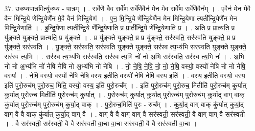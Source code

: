 \documentclass[17pt]{extarticle}
\begin{document}
37. उ॒क्थ्य॒पा॒त्रमित्यु॑क्थ्य - पा॒त्रम् । . सर्वे॑णै॒ वैव सर्वे॑ण॒ सर्वे॑णै॒वैन॑ मेन मे॒व सर्वे॑ण॒ सर्वे॑णै॒वैन᳚म् । . ए॒वैन॑ मेन मे॒वै वैन॑ मिन्द्रि॒ये णे᳚न्द्रि॒येणै॑न मे॒वै वैन॑ मिन्द्रि॒येण॑ । . ए॒न॒ मि॒न्द्रि॒ये णे᳚न्द्रि॒येणै॑न मेन मिन्द्रि॒येणा त्यती᳚न्द्रि॒येणै॑न मेन मिन्द्रि॒येणाति॑ । . इ॒न्द्रि॒येणा त्यती᳚न्द्रि॒ये णे᳚न्द्रि॒येणाति॒ प्र प्राती᳚न्द्रि॒ये णे᳚न्द्रि॒येणाति॒ प्र । . अति॒ प्र प्रात्यति॒ प्र यु॑ङ्क्ते युङ्क्ते॒ प्रात्यति॒ प्र यु॑ङ्क्ते । . प्र यु॑ङ्क्ते युङ्क्ते॒ प्र प्र यु॑ङ्क्ते॒ सर॑स्वति॒ सर॑स्वति युङ्क्ते॒ प्र प्र यु॑ङ्क्ते॒ सर॑स्वति । . यु॒ङ्क्ते॒ सर॑स्वति॒ सर॑स्वति युङ्क्ते युङ्क्ते॒ सर॑स्व त्य॒भ्य॑भि सर॑स्वति युङ्क्ते युङ्क्ते॒ सर॑स्व त्य॒भि । . सर॑स्व त्य॒भ्य॑भि सर॑स्वति॒ सर॑स्व त्य॒भि नो॑ नो अ॒भि सर॑स्वति॒ सर॑स्व त्य॒भि नः॑ । . अ॒भि नो॑ नो अ॒भ्य॑भि नो॑ नेषि नेषि नो अ॒भ्य॑भि नो॑ नेषि । . नो॒ ने॒षि॒ ने॒षि॒ नो॒ नो॒ ने॒षि॒ वस्यो॒ वस्यो॑ नेषि नो नो नेषि॒ वस्यः॑ । . ने॒षि॒ वस्यो॒ वस्यो॑ नेषि नेषि॒ वस्य॒ इतीति॒ वस्यो॑ नेषि नेषि॒ वस्य॒ इति॑ । . वस्य॒ इतीति॒ वस्यो॒ वस्य॒ इति॑ पुरो॒रुच॑म् पुरो॒रुच॒ मिति॒ वस्यो॒ वस्य॒ इति॑ पुरो॒रुच᳚म् । . इति॑ पुरो॒रुच॑म् पुरो॒रुच॒ मितीति॑ पुरो॒रुच॑म् कुर्यात् कुर्यात् पुरो॒रुच॒ मितीति॑ पुरो॒रुच॑म् कुर्यात् । . पु॒रो॒रुच॑म् कुर्यात् कुर्यात् पुरो॒रुच॑म् पुरो॒रुच॑म् कुर्या॒द् वाग् वाक् कु॑र्यात् पुरो॒रुच॑म् पुरो॒रुच॑म् कुर्या॒द् वाक् । . पु॒रो॒रुच॒मिति॑ पुरः - रुच᳚म् । . कु॒र्या॒द् वाग् वाक् कु॑र्यात् कुर्या॒द् वाग् वै वै वाक् कु॑र्यात् कुर्या॒द् वाग् वै । . वाग् वै वै वाग् वाग् वै सर॑स्वती॒ सर॑स्वती॒ वै वाग् वाग् वै सर॑स्वती । . वै सर॑स्वती॒ सर॑स्वती॒ वै वै सर॑स्वती वा॒चा वा॒चा सर॑स्वती॒ वै वै सर॑स्वती वा॒चा । \newline
\pagebreak
{}
\end{document}
